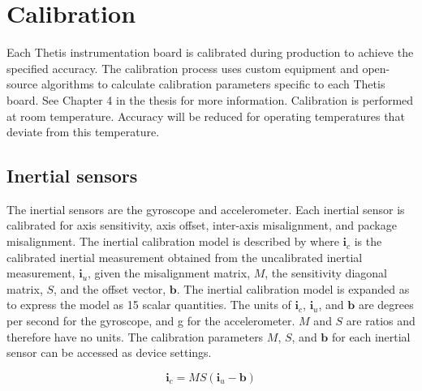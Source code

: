 \section{Calibration}
\label{sec:calibration}

Each Thetis instrumentation board is calibrated during production to achieve the specified accuracy.
The calibration process uses custom equipment and open-source algorithms to calculate calibration parameters specific to each Thetis board.
See Chapter 4 in the thesis for more information.
Calibration is performed at room temperature.
Accuracy will be reduced for operating temperatures that deviate from this temperature.

\subsection{Inertial sensors}
\label{sec:inertialSensor}

The inertial sensors are the gyroscope and accelerometer.
Each inertial sensor is calibrated for axis sensitivity, axis offset, inter-axis misalignment, and package misalignment.
The inertial calibration model is described by  where $\pmb{i}_c$ is the calibrated inertial measurement obtained from the uncalibrated inertial measurement, $\pmb{i}_u$, given the misalignment matrix, $M$, the sensitivity diagonal matrix, $S$, and the offset vector, $\pmb{b}$.
The inertial calibration model is expanded as  to express the model as 15 scalar quantities.  
The units of $\pmb{i}_c$, $\pmb{i}_u$, and $\pmb{b}$ are degrees per second for the gyroscope, and g for the accelerometer.
$M$ and $S$ are ratios and therefore have no units.  
The calibration parameters $M$, $S$, and $\pmb{b}$ for each inertial sensor can be accessed as device settings.

\begin{equation}
    \label{eq:inertial}
    \pmb{i}_c = M S (\pmb{i}_u - \pmb{b})
\end{equation}

